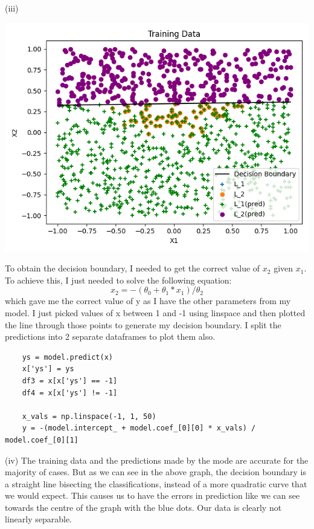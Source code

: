 \documentclass[10pt,a4paper]{article}
\begin{document}
(iii)
\begin{center}
\includegraphics[scale=0.3]{x1vx2pred.jpg}
\end{center}
To obtain the decision boundary, I needed to get the correct value of \(x_2\) given \(x_1\). To achieve this, I just needed to solve the following equation: \[x_2 = -(\theta_0 + \theta_1*x_1)/\theta_2\] which gave me the correct value of y as I have the other parameters from my model. I just picked values of x between 1 and -1 using linspace and then plotted the line through those points to generate my decision boundary. I split the predictions into 2 separate dataframes to plot them also. 
\begin{verbatim}
    ys = model.predict(x)
    x['ys'] = ys
    df3 = x[x['ys'] == -1]
    df4 = x[x['ys'] != -1]

    x_vals = np.linspace(-1, 1, 50)
    y = -(model.intercept_ + model.coef_[0][0] * x_vals) / model.coef_[0][1]
\end{verbatim}
(iv)
The training data and the predictions made by the mode are accurate for the majority of cases. But as we can see in the above graph, the decision boundary is a straight line bisecting the classifications, instead of a more quadratic curve that we would expect. This causes us to have the errors in prediction like we can see towards the centre of the graph with the blue dots. Our data is clearly not linearly separable. 
\end{document}
